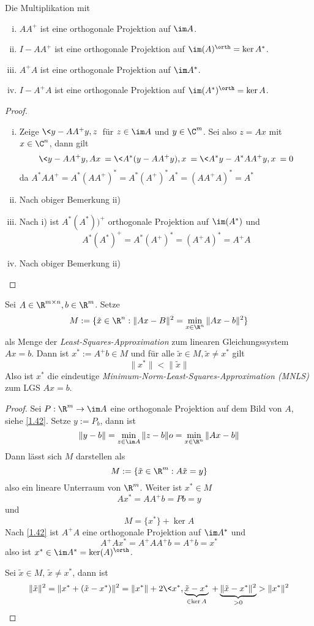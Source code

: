 \documentclass[11pt]{scrbook}
\begin{document}
\begin{lem}
	\label{1.42}
	Die Multiplikation mit
	\begin{enumerate}[i)]
		\item
			$AA^+$ ist eine orthogonale Projektion auf $\im A$.
		\item
			$I-AA^+$ ist eine orthogonale Projektion auf $\im (A)^\orth = \ker A^*$.
		\item
			$A^+A$ ist eine orthogonale Projektion auf $\im A^*$.
		\item
			$I-A^+A$ ist eine orthogonale Projektion auf $\im (A^*)^\orth = \ker A$.
	\end{enumerate}
	\begin{proof}
		\begin{enumerate}[i)]
			\item
				Zeige $\<y-AA^+y, z\>$ für $z\in \im A$ und $y\in \C^m$.
				Sei also $z=Ax$ mit $x\in \C^n$, dann gilt
				\[
					\<y-AA^+y,Ax\> = \<A^*(y-AA^+y),x\> = \<A^*y - A^*AA^+y,x\> = 0
				\]
				da $A^*AA^+ = A^*(AA^+)^* = A^*(A^+)^* A^* = (AA^+A)^* = A^*$
			\item
				Nach obiger Bemerkung ii)
			\item
				Nach i) ist $A^*(A^*))^+$ orthogonale Projektion auf $\im (A^*)$ und
				\[
					A^*(A^*)^+ = A^*(A^+)^* = (A^+A)^* = A^+A
				\]
			\item
				Nach obiger Bemerkung ii)
		\end{enumerate}
	\end{proof}
\end{lem}

\begin{st}
	\label{1.43}
	Sei $A\in \R^{m\times n}, b\in \R^m$.
	Setze
	\[
		M := \{ \tilde x\in \R^n : \|Ax-B\|^2 = \min_{x\in \R^n}\|Ax-b\|^2\}
	\]
	als Menge der \emph{Least-Squares-Approximation} zum linearen Gleichungssystem $Ax=b$.
	Dann ist $x^* := A^+b \in M$ und für alle $\tilde x\in M, \tilde x \neq x^*$ gilt
	\[
		\|x^*\| < \| \tilde x \|
	\]
	Also ist $x^*$ die eindeutige \emph{Minimum-Norm-Least-Squares-Approximation (MNLS)} zum LGS $Ax=b$.
	\begin{proof}
		Sei $P: \R^m \to \im A$ eine orthogonale Projektion auf dem Bild von $A$, siehe \ref{1.42}.
		Setze $y:= P_b$, dann ist
		\[
			\|y-b\| = \min_{z\in \im A}\|z-b\|o = \min_{x\in \R^n}\|Ax-b\|
		\]
		Dann lässt sich $M$ darstellen als
		\[
			M := \{ \tilde x \in \R^m : A\tilde x = y\}
		\]
		also ein lineare Unterraum von $\R^m$.
		Weiter ist $x^* \in M$
		\[
			Ax^* = AA^+ b = Pb = y
		\]
		und
		\[
			M = \{x^*\} + \ker A
		\]
		Nach \ref{1.42} ist $A^+A$ eine orthogonale Projektion auf $\im A^*$ und 
		\[
			A^+Ax^* = A^+AA^+ b = A^+b = x^*
		\]
		also ist $x^* \in \im A^* = \ker( A)^\orth$.

		Sei $\tilde x \in M$, $\tilde x \neq x^*$, dann ist
		\[
			\|\tilde x\|^2 = \|x^* + (\tilde x - x^*)\|^2 = \|x^*\| + 2\< x^*,\underbrace{\tilde x - x^*}_{\in \ker A}\> + \underbrace{\|\tilde x - x^*\|^2}_{>0} > \|x^*\|^2
		\]
	\end{proof}
\end{st}
\end{document}
